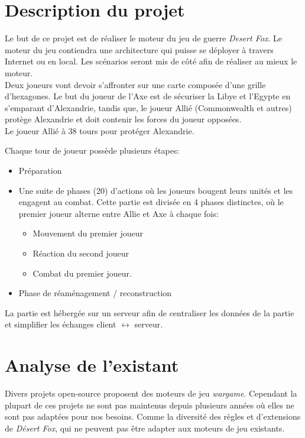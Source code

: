\section{Description du projet}

Le but de ce projet est de réaliser le moteur du jeu de guerre \emph{Desert Fox}. Le moteur du jeu contiendra une architecture qui puisse se déployer à travers Internet ou en local. Les scénarios seront mis de côté afin de réaliser au mieux le moteur.\\

Deux joueurs vont devoir s'affronter sur une carte composée d'une grille d'hexagones. Le but du joueur de l'Axe est de sécuriser la Libye et l'Egypte en s'emparant d'Alexandrie, tandis que, le joueur Allié (Commonwealth et autres) protège Alexandrie et doit contenir les forces du joueur opposées.\\
Le joueur Allié à 38 tours pour protéger Alexandrie.

Chaque tour de joueur possède plusieurs étapes:
\begin{itemize}
    \item Préparation
    \item Une suite de phases (20) d'actions où les joueurs bougent leurs unités et les engagent au combat. Cette partie est divisée en 4 phases distinctes, où le premier joueur alterne entre Allie et Axe à chaque fois:
    \begin{itemize}
        \item Mouvement du premier joueur
        \item Réaction du second joueur
        \item Combat du premier joueur.
    \end{itemize}
    \item Phase de réaménagement / reconstruction
\end{itemize}


La partie est hébergée sur un serveur afin de centraliser les données de la partie et simplifier les échanges client $\leftrightarrow$ serveur.

\section{Analyse de l'existant}

Divers projets open-source proposent des moteurs de jeu \emph{wargame}. Cependant la plupart de ces projets ne sont pas maintenus depuis plusieurs années où elles ne sont pas adaptées pour nos besoins. Comme la diversité des règles et d'extensions de \emph{Désert Fox}, qui ne peuvent pas être adapter aux moteurs de jeu existants.

